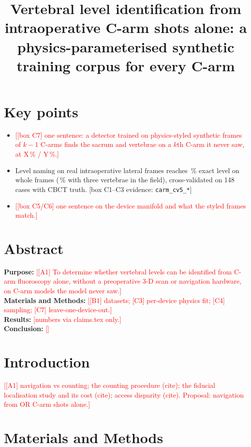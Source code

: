 \documentclass[11pt]{article}
\title{Vertebral level identification from intraoperative C-arm shots alone: a physics-parameterised synthetic training corpus for every C-arm}
\author{\todo{authors}}
\date{}
\newcommand{\todo}[1]{\textcolor{red}{[#1]}}
\begin{document}
\maketitle

\section*{Key points}
\begin{itemize}
  \item \todo{[box C7] one sentence: a detector trained on physics-styled synthetic frames of $k-1$ C-arms finds the sacrum and vertebrae on a $k$th C-arm it never saw, at X\,\% / Y\,\%.}
  \item Level naming on real intraoperative lateral frames reaches \clCarmCvFiveLatWholeExact\,\% exact level on whole frames (\clCarmCvFiveLatKThreeExact\,\% with three vertebrae in the field), cross-validated on 148 cases with CBCT truth. [box C1--C3 evidence: \texttt{carm\_cv5\_*}]
  \item \todo{[box C5/C6] one sentence on the device manifold and what the styled frames match.}
\end{itemize}

\section*{Abstract}
\textbf{Purpose:} \todo{[A1] To determine whether vertebral levels can be identified from C-arm fluoroscopy alone, without a preoperative 3-D scan or navigation hardware, on C-arm models the model never saw.}\\
\textbf{Materials and Methods:} \todo{[B1] datasets; [C3] per-device physics fit; [C4] sampling; [C7] leave-one-device-out.}\\
\textbf{Results:} \todo{numbers via claims.tex only.}\\
\textbf{Conclusion:} \todo{}

\section{Introduction}
\todo{[A1] navigation vs counting; the counting procedure (cite); the fiducial localisation study and its cost (cite); access disparity (cite). Proposal: navigation from OR C-arm shots alone.}

\section{Materials and Methods}
\end{document}
